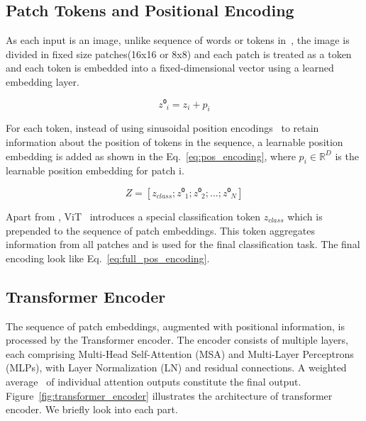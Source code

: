 \subsection{Patch Tokens and Positional Encoding}

As each input is an image, unlike sequence of words or tokens in~\cite{vaswani2023attentionneed}, the image is divided in fixed size patches(16x16 or 8x8) and each patch is treated as a token and each token is embedded into a fixed-dimensional vector using a learned embedding layer.

\begin{equation}
	\label{eq:pos_encoding}
	z⁰_i = z_i + p_i
\end{equation} 

For each token, instead of using sinusoidal position encodings~\cite{vaswani2023attentionneed} to retain information about the position of tokens in the sequence, a learnable position embedding is added as shown in the Eq.~\ref{eq:pos_encoding}, where \(p_i \in \mathbb{R}^{D}\) is the learnable position embedding for patch i. 

\begin{equation}
	\label{eq:full_pos_encoding}
	Z = [z_{class}; z⁰_1; z⁰_2;...; z⁰_N]
\end{equation}

Apart from \cite{vaswani2023attentionneed}, ViT~\cite{dosovitskiy2020image} introduces a special classification token \(z_{class}\) which is prepended to the sequence of patch embeddings. This token aggregates information from all patches and is used for the final classification task. The final encoding look like Eq.~\ref{eq:full_pos_encoding}.

\subsection{Transformer Encoder}
The sequence of patch embeddings, augmented with positional information, is processed by the Transformer encoder. The encoder consists of multiple layers, each comprising Multi-Head Self-Attention (MSA) and Multi-Layer Perceptrons (MLPs), with Layer Normalization (LN) and residual connections. A weighted average~\cite{weng2020transformer} of individual attention outputs constitute the final output. Figure~\ref{fig:transformer_encoder} illustrates the architecture of transformer encoder. We briefly look into each part.

